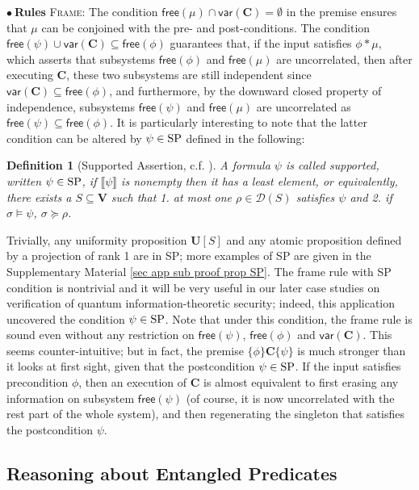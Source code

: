 \documentclass[conference,compsoc, 10pt]{IEEEtran}
\newtheorem{definition}{Definition}[section]
\newcommand {\cD } {{\mathcal{D}}}
\newcommand {\free }[1] {{\mathsf{free}\left(#1\right)}}
\newcommand {\vars } {\mathbf{V}}
\newcommand {\var } {\mathsf{var}}
\newcommand {\unia } {{\mathbf{U}}}
\newcommand {\prog } {{\mathbf{C}}}
\newcommand {\sem}[1] {\llbracket#1\rrbracket}
\begin{document}
	\noindent$\bullet\ $\noindent\textbf{Rules} \textsc{Frame}: 	
		The condition $\free{\mu}\cap\var(\prog)=\emptyset$ in the premise ensures that $\mu$ can be conjoined with the pre- and post-conditions. The condition  $\free{\psi}\cup\var(\prog)\subseteq\free{\phi}$ guarantees that, if the input satisfies $\phi\ast\mu$, which asserts that subsystems $\free{\phi}$ and $\free{\mu}$ are uncorrelated, then after executing $\prog$, these two subsystems are still independent since $\var(\prog)\subseteq\free{\phi}$, and furthermore, by the downward closed property of independence, subsystems $\free{\psi}$ and $\free{\mu}$ are uncorrelated as $\free{\psi}\subseteq\free{\phi}$.
		It is particularly interesting to note that the latter condition can be altered by  $\psi\in{\rm SP}$ defined in the following:
		\begin{definition}[Supported Assertion, c.f. \cite{Rey08}]
			\label{def SP}
			A formula $\psi$ is called supported, written $\psi\in{\rm SP}$, if $\sem{\psi}$ is nonempty then it has a least element, or equivalently, there exists a $S\subseteq\vars$ such that 1. at most one $\rho\in\cD(S)$ satisfies $\psi$ and 2. if $\sigma\models\psi$, $\sigma\succeq\rho$.
		\end{definition}
		
		Trivially, any uniformity proposition $\unia[S]$ and any atomic proposition
    defined by a projection of rank 1 are in SP; more examples of SP are given
    in the  Supplementary Material \ref{sec app sub proof prop SP}. The frame rule with SP condition is nontrivial
    and it will be very useful in our later case studies on verification of
    quantum information-theoretic security; indeed, this application uncovered
    the condition $\psi\in{\rm SP}$. 
    Note that under this condition, the frame rule is sound even without any restriction on $\free{\psi}$, $\free{\phi}$ and $\var(\prog)$. This seems counter-intuitive; but in fact, the premise $\{\phi\}\prog\{\psi\}$ is much stronger than it looks at first sight, given that the postcondition $\psi\in{\rm SP}$. If the input satisfies precondition $\phi$, then an execution of $\prog$ is almost equivalent to first erasing any information on subsystem $\free{\psi}$ (of course, it is now uncorrelated with the rest part of the whole system), and then regenerating the singleton that satisfies the postcondition $\psi$.
	
	\subsection{Reasoning about Entangled Predicates}
	\label{sec Local Reasoning Entangle}
	
\end{document}
